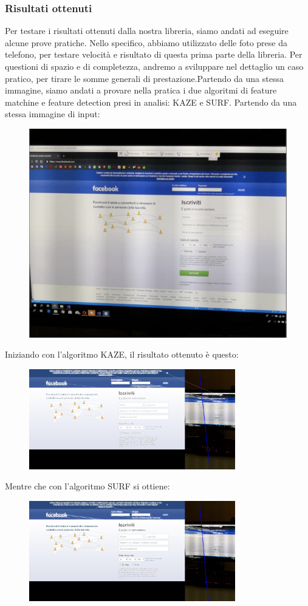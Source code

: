 \documentclass[twoside]{supsistudent}
\newcommand{\Decaa}{\newline\vspace{0.5mm}\newline\noindent}
\begin{document}
\subsubsection{Risultati ottenuti}
Per testare i risultati ottenuti dalla nostra libreria, siamo andati ad eseguire alcune prove pratiche. Nello specifico, abbiamo utilizzato delle foto prese da telefono, per testare velocità e risultato di questa prima parte della libreria.\Decaa
Per questioni di spazio e di completezza, andremo a sviluppare nel dettaglio un caso pratico, per tirare le somme generali di prestazione.Partendo da una stessa immagine, siamo andati a provare nella pratica i due algoritmi di feature matchine e feature detection presi in analisi: KAZE e SURF.
\Decaa
Partendo da una stessa immagine di input:
\newline
\begin{figure}[h!]
  \centering
    \includegraphics[height=0.3\textwidth]{Pictures/imageToFindTrim.png}
\end{figure}
\newline
Iniziando con l'algoritmo KAZE, il risultato ottenuto è questo:
\begin{figure}[h!]
  \centering
    \includegraphics[width=0.8\textwidth]{Pictures/resultKAZE.jpeg}
\end{figure}
\newline
Mentre che con l'algoritmo SURF si ottiene:
\begin{figure}[h!]
  \centering
    \includegraphics[width=0.8\textwidth]{Pictures/resultSURF.jpeg}
\end{figure}
\end{document}

